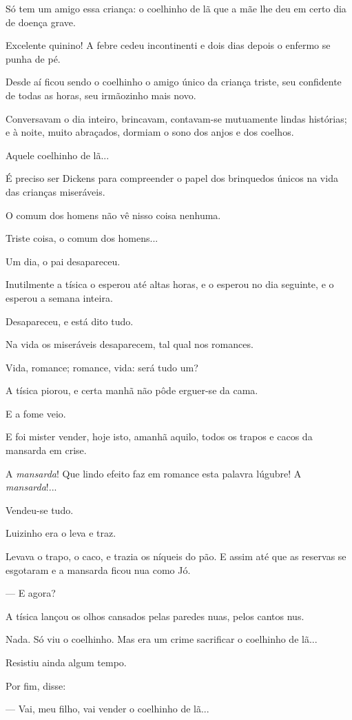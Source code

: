 Só tem um amigo essa criança: o coelhinho de lã que a mãe lhe deu em
certo dia de doença grave.

Excelente quinino! A febre cedeu incontinenti e dois dias depois o
enfermo se punha de pé.

Desde aí ficou sendo o coelhinho o amigo único da criança triste, seu
confidente de todas as horas, seu irmãozinho mais novo.

Conversavam o dia inteiro, brincavam, contavam-se mutuamente lindas
histórias; e à noite, muito abraçados, dormiam o sono dos anjos e dos
coelhos.

Aquele coelhinho de lã...

É preciso ser Dickens para compreender o papel dos brinquedos únicos na
vida das crianças miseráveis.

O comum dos homens não vê nisso coisa nenhuma.

Triste coisa, o comum dos homens...

Um dia, o pai desapareceu.

Inutilmente a tísica o esperou até altas horas, e o esperou no dia
seguinte, e o esperou a semana inteira.

Desapareceu, e está dito tudo.

Na vida os miseráveis desaparecem, tal qual nos romances.

Vida, romance; romance, vida: será tudo um?

A tísica piorou, e certa manhã não pôde erguer-se da cama.

E a fome veio.

E foi mister vender, hoje isto, amanhã aquilo, todos os trapos e cacos
da mansarda em crise.

A \emph{mansarda}! Que lindo efeito faz em romance esta palavra lúgubre!
A \emph{mansarda}!...

Vendeu-se tudo.

Luizinho era o leva e traz.

Levava o trapo, o caco, e trazia os níqueis do pão. E assim até que as
reservas se esgotaram e a mansarda ficou nua como Jó.

--- E agora?

A tísica lançou os olhos cansados pelas paredes nuas, pelos cantos nus.

Nada. Só viu o coelhinho. Mas era um crime sacrificar o coelhinho de
lã...

Resistiu ainda algum tempo.

Por fim, disse:

--- Vai, meu filho, vai vender o coelhinho de lã...


